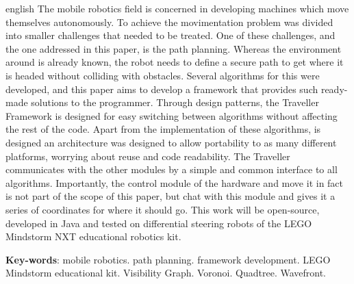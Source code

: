 \begin{resumo}[Abstract]
 \begin{otherlanguage*}{english}
   The mobile robotics field is concerned in developing machines which move themselves autonomously. To achieve the movimentation problem was divided into smaller challenges that needed to be treated. One of these challenges, and the one addressed in this paper, is the path planning. Whereas the environment around is already known, the robot needs to define a secure path to get where it is headed without colliding with obstacles. Several algorithms for this were developed, and this paper aims to develop a framework that provides such ready-made solutions to the programmer. Through design patterns, the Traveller Framework is designed for easy switching between algorithms without affecting the rest of the code. Apart from the implementation of these algorithms, is designed an architecture was designed to allow portability to as many different platforms, worrying about reuse and code readability. The Traveller communicates with the other modules by a simple and common interface to all algorithms. Importantly, the control module of the hardware and move it in fact is not part of the scope of this paper, but chat with this module and gives it a series of coordinates for where it should go. This work will be open-source, developed in Java and tested on differential steering robots of the LEGO Mindstorm NXT educational robotics kit.

   \vspace{\onelineskip}
 
   \noindent 
   \textbf{Key-words}: mobile robotics. path planning. framework development. LEGO Mindstorm educational kit. Visibility Graph. Voronoi. Quadtree. Wavefront.
 \end{otherlanguage*}
\end{resumo}
